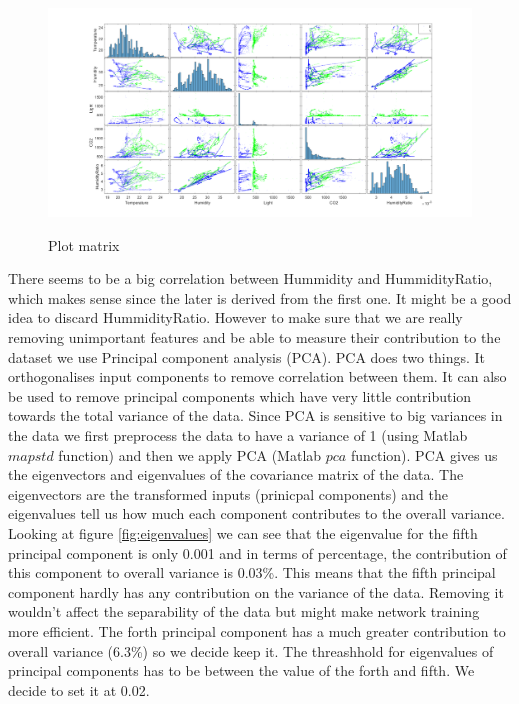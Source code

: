 \documentclass[a4paper, 11pt]{article}
\begin{document}
\begin{figure}[h]
  \caption{Plot matrix}
  \centering
    \includegraphics[width=1\textwidth]{../figures/plotmatrix.png}
    \label{fig:plotmatrix}
\end{figure}

There seems to be a big correlation between Hummidity and HummidityRatio, which makes sense since the later is derived from the first one. It might be a good idea to discard HummidityRatio. However to make sure that we are really removing unimportant features and be able to measure their contribution to the dataset we use Principal component analysis (PCA). PCA does two things. It orthogonalises input components to remove correlation between them. It can also be used to remove principal components which have very little contribution towards the total variance of the data. Since PCA is sensitive to big variances in the data we first preprocess the data to have a variance of 1 (using Matlab $mapstd$ function) and then we apply PCA (Matlab $pca$ function). PCA gives us the eigenvectors and eigenvalues of the covariance matrix of the data. The eigenvectors are the transformed inputs (prinicpal components) and the eigenvalues tell us how much each component contributes to the overall variance. Looking at figure \ref{fig:eigenvalues} we can see that the eigenvalue for the fifth principal component is only 0.001 and in terms of percentage, the contribution of this component to overall variance is 0.03\%. This means that the fifth principal component hardly has any contribution on the variance of the data. Removing it wouldn't affect the separability of the data but might make network training more efficient. The forth principal component has a much greater contribution to overall variance (6.3\%) so we decide keep it. The threashhold for eigenvalues of principal components has to be between the value of the forth and fifth. We decide to set it at 0.02. 
\end{document}
